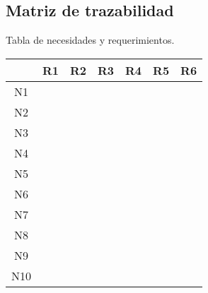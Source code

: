 \subsection{Matriz de trazabilidad}
\label{Matriz_de_trazabilidad}
%
Tabla de necesidades y requerimientos.


\begin{tabular}{ | c | c | c | c | c | c | c | } 
 \hline
  & R1 & R2 & R3 & R4 & R5 & R6 \\
 \hline
 N1  &  &  &  &  &   &   \\
\hline
 N2  &  &  &  &  &   &   \\
\hline
 N3  &  &  &  &  &   &   \\
\hline
 N4  &  &  &  &  &   &   \\
\hline
 N5  &  &  &  &  &   &   \\
\hline
 N6  &  &  &  &  &   &   \\
\hline
 N7  &  &  &  &  &   &   \\
\hline
 N8  &  &  &  &  &   &   \\
\hline
 N9  &  &  &  &  &   &   \\
\hline
 N10  &  &  &  &  &   &   \\
\hline
\end{tabular}